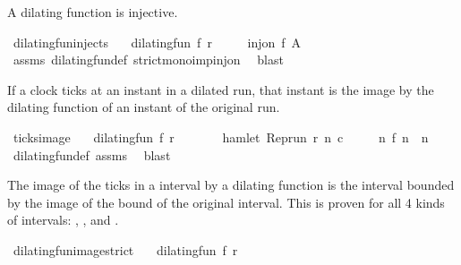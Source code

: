 \begin{isabellebody}
\begin{isamarkuptext}
A dilating function is injective.%
\end{isamarkuptext}\isamarkuptrue%
\isamarkupfalse%
\ dilating{\isacharunderscore}fun{\isacharunderscore}injects{\isacharcolon}\isanewline
\ \ \ {\isacartoucheopen}dilating{\isacharunderscore}fun\ f\ r{\isacartoucheclose}\isanewline
\ \ \ \ \ {\isacartoucheopen}inj{\isacharunderscore}on\ f\ A{\isacartoucheclose}\isanewline
%
\isadelimproof
%
\endisadelimproof
%
\isatagproof
{}\isamarkupfalse%
\ assms\ dilating{\isacharunderscore}fun{\isacharunderscore}def\ strict{\isacharunderscore}mono{\isacharunderscore}imp{\isacharunderscore}inj{\isacharunderscore}on\ \isamarkupfalse%
\ blast%
\endisatagproof
{\isafoldproof}%
%
\isadelimproof
%
\endisadelimproof
%
\begin{isamarkuptext}%
If a clock ticks at an instant in a dilated run, that instant is the image
  by the dilating function of an instant of the original run.%
\end{isamarkuptext}\isamarkuptrue%
\isamarkupfalse%
\ ticks{\isacharunderscore}image{\isacharcolon}\isanewline
\ \ \ {\isacartoucheopen}dilating{\isacharunderscore}fun\ f\ r{\isacartoucheclose}\isanewline
\ \ \ \ \ \ \ {\isacartoucheopen}hamlet\ {\isacharparenleft}{\isacharparenleft}Rep{\isacharunderscore}run\ r{\isacharparenright}\ n\ c{\isacharparenright}{\isacartoucheclose}\isanewline
\ \ \ \ \ {\isacartoucheopen}{\isasymexists}n\ f\ n\ {\isacharequal}\ n{\isacartoucheclose}\isanewline
%
\isadelimproof
%
\endisadelimproof
%
\isatagproof
{}\isamarkupfalse%
\ dilating{\isacharunderscore}fun{\isacharunderscore}def\ assms\ \isamarkupfalse%
\ blast%
\endisatagproof
{\isafoldproof}%
%
\isadelimproof
%
\endisadelimproof
%
\begin{isamarkuptext}%
The image of the ticks in a interval by a dilating function is the interval 
  bounded by the image of the bound of the original interval.
  This is proven for all 4 kinds of intervals:  \isatt{]m{\char`\,}\ n[}, \isatt{[m{\char`\,}\ n[}, \isatt{]m{\char`\,}\ n]} and \isatt{[m{\char`\,}\ n]}.%
\end{isamarkuptext}\isamarkuptrue%
\isamarkupfalse%
\ dilating{\isacharunderscore}fun{\isacharunderscore}image{\isacharunderscore}strict{\isacharcolon}\isanewline
\ \ \ {\isacartoucheopen}dilating{\isacharunderscore}fun\ f\ r{\isacartoucheclose}\isanewline

\end{isabellebody}
